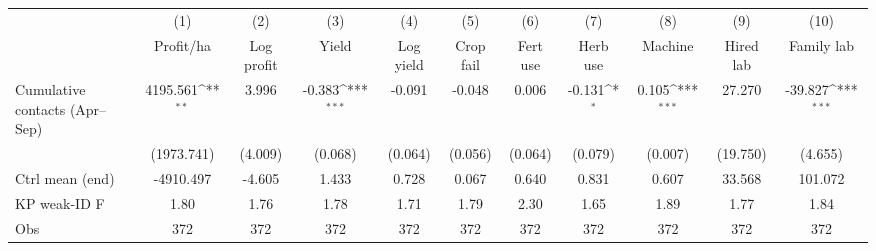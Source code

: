 {
\def\sym#1{\ifmmode^{#1}\else\(^{#1}\)\fi}
\begin{tabular}{l*{10}{c}}
\toprule
                    &\multicolumn{1}{c}{(1)}&\multicolumn{1}{c}{(2)}&\multicolumn{1}{c}{(3)}&\multicolumn{1}{c}{(4)}&\multicolumn{1}{c}{(5)}&\multicolumn{1}{c}{(6)}&\multicolumn{1}{c}{(7)}&\multicolumn{1}{c}{(8)}&\multicolumn{1}{c}{(9)}&\multicolumn{1}{c}{(10)}\\
                    &\multicolumn{1}{c}{Profit/ha}&\multicolumn{1}{c}{Log profit}&\multicolumn{1}{c}{Yield}&\multicolumn{1}{c}{Log yield}&\multicolumn{1}{c}{Crop fail}&\multicolumn{1}{c}{Fert use}&\multicolumn{1}{c}{Herb use}&\multicolumn{1}{c}{Machine}&\multicolumn{1}{c}{Hired lab}&\multicolumn{1}{c}{Family lab}\\
\midrule
Cumulative contacts (Apr--Sep)&    4195.561\sym{**} &       3.996         &      -0.383\sym{***}&      -0.091         &      -0.048         &       0.006         &      -0.131\sym{*}  &       0.105\sym{***}&      27.270         &     -39.827\sym{***}\\
                    &  (1973.741)         &     (4.009)         &     (0.068)         &     (0.064)         &     (0.056)         &     (0.064)         &     (0.079)         &     (0.007)         &    (19.750)         &     (4.655)         \\
\midrule
Ctrl mean (end)     &   -4910.497         &      -4.605         &       1.433         &       0.728         &       0.067         &       0.640         &       0.831         &       0.607         &      33.568         &     101.072         \\
KP weak-ID F        &        1.80         &        1.76         &        1.78         &        1.71         &        1.79         &        2.30         &        1.65         &        1.89         &        1.77         &        1.84         \\
Obs                 &         372         &         372         &         372         &         372         &         372         &         372         &         372         &         372         &         372         &         372         \\
\bottomrule
\end{tabular}
}
